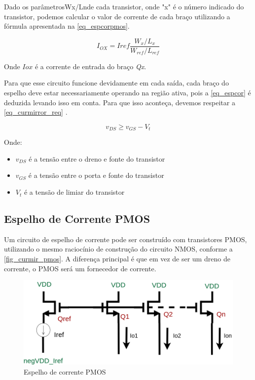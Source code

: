 Dado os parâmetrosWx/Lnde cada transistor, onde "x" é o número indicado do transistor, podemos calcular o valor de corrente de cada braço utilizando a fórmula apresentada na \autoref{eq_espcorpmos}.

\begin{equation}
    \label{eq_espcor}
    I_{OX} = Iref\frac{W_x/L_x}{W_{ref}/L_{ref}}
\end{equation}

Onde $I{ox}$ \'e a corrente de entrada do bra{\c c}o \emph{Qx}. 

Para que esse circuito funcione devidamente em cada sa\'ida, cada bra{\c c}o do espelho deve estar necessariamente operando na regi\~ao ativa, pois a \autoref{eq_espcor} \'e deduzida levando isso em conta. Para que isso aconte{\c c}a, devemos respeitar a \autoref{eq_curmirror_req} \cite{RazaviFundM}.

\begin{equation}
    \label{eq_curmirror_req}
    v_{DS} \geq v_{GS} - V_t
\end{equation}

Onde:

\begin{itemize}
    \item $v_{DS}$ \'e a tens\~ao entre o dreno e fonte do transistor
    \item $v_{GS}$ \'e a tens\~ao entre o porta e fonte do transistor
    \item $V_{t}$ \'e a tens\~ao de limiar do transistor
\end{itemize}

\subsection{Espelho de Corrente PMOS}

Um circuito de espelho de corrente pode ser constru\'ido com transistores PMOS, utilizando o mesmo racioc\'inio de constru{\c c}\~ao do circuito NMOS, conforme a \autoref{fig_curmir_pmos}. A diferen{\c c}a principal \'e que em vez de ser um dreno de corrente, o PMOS ser\'a um fornecedor de corrente.

\begin{figure}[htb]
    \label{fig_curmir_pmos}
    \centering
    \caption{Espelho de corrente PMOS} 
    \includegraphics[scale=0.4]{Circuitos/current_mirror_example_pmos.png}
\end{figure}

